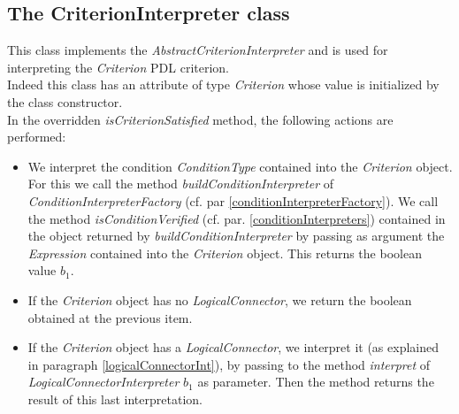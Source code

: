 \documentclass[a4paper,11pt] {ivoa}
\begin{document}
\subsection{The CriterionInterpreter class}
This class  implements the  {\it AbstractCriterionInterpreter} and is used for interpreting the {\it Criterion} PDL criterion. \\
Indeed this class has an attribute of type {\it Criterion} whose value is initialized by the class constructor. \\
In the overridden {\it isCriterionSatisfied} method, the following actions are performed:
\begin{itemize}
\item We interpret the condition {\it ConditionType} contained into the {\it Criterion} object.
For this we call the method {\it buildConditionInterpreter} of  {\it ConditionInterpreterFactory} (cf. par \ref{conditionInterpreterFactory}). We call the method {\it isConditionVerified} (cf. par. \ref{conditionInterpreters}) contained in the object returned by {\it buildConditionInterpreter} by passing as argument the {\it Expression} contained into the {\it Criterion} object. This returns the boolean value $b_1$.
\item If the {\it Criterion} object has no {\it LogicalConnector}, we return the boolean obtained at the previous item. 
\item If the {\it Criterion} object has a {\it LogicalConnector}, we interpret it (as explained in paragraph \ref{logicalConnectorInt}), by passing to the method {\it interpret} of {\it LogicalConnectorInterpreter}  $b_1$ as parameter. Then the method returns the result of this last interpretation.
\end{itemize}
\end{document}
